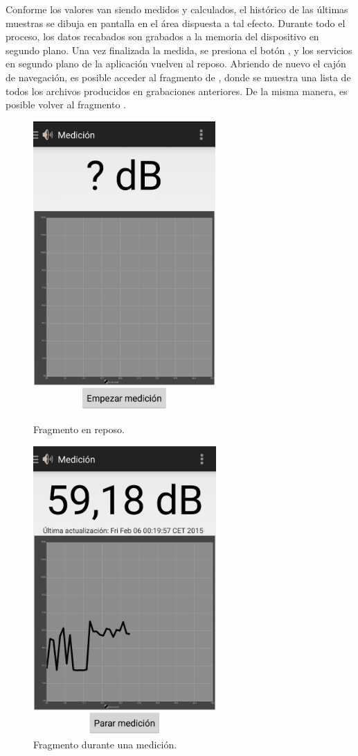     Conforme los valores van siendo medidos y calculados, el histórico de las últimas muestras se dibuja en pantalla en el área dispuesta a tal efecto. Durante todo el proceso, los datos recabados son grabados a la memoria del dispositivo en segundo plano. Una vez finalizada la medida, se presiona el botón , y los servicios en segundo plano de la aplicación vuelven al reposo. Abriendo de nuevo el cajón de navegación, es posible acceder al fragmento de , donde se muestra una lista de todos los archivos producidos en grabaciones anteriores. De la misma manera, es posible volver al fragmento .
 
    \begin{figure}[H] \centering
 \begin{minipage}{0.45\textwidth}\centering
    \includegraphics[height=11cm]{graphs/measure-empty.png} \caption{Fragmento  en reposo.}\label{fig:screen:measure-empty}
 \end{minipage}
 \hfill
\begin{minipage}{0.45\textwidth}\centering
    \includegraphics[height=11cm]{graphs/screen_measure.png} \caption{Fragmento  durante una medición.}\label{fig:screen:measure}

\end{minipage}
\end{figure}
